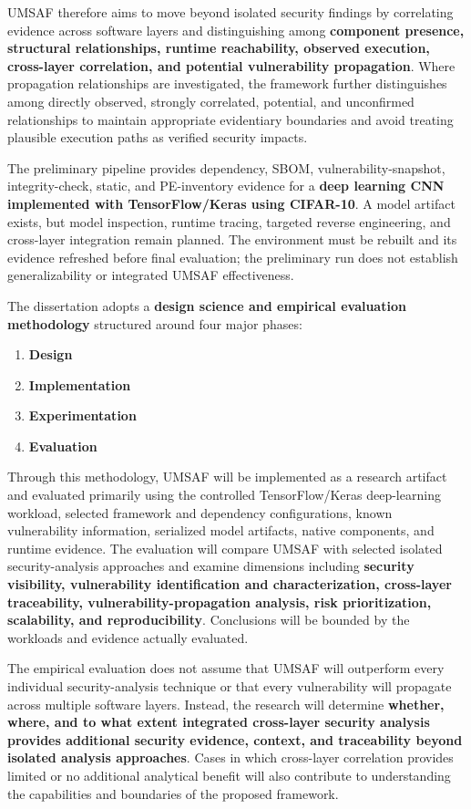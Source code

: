 \documentclass[
  12pt,
  letterpaper,
  oneside]{report}
\begin{document}
UMSAF therefore aims to move beyond isolated security findings by
correlating evidence across software layers and distinguishing among
\textbf{component presence, structural relationships, runtime
reachability, observed execution, cross-layer correlation, and potential
vulnerability propagation}. Where propagation relationships are
investigated, the framework further distinguishes among directly
observed, strongly correlated, potential, and unconfirmed relationships
to maintain appropriate evidentiary boundaries and avoid treating
plausible execution paths as verified security impacts.

The preliminary pipeline provides dependency, SBOM,
vulnerability-snapshot, integrity-check, static, and PE-inventory
evidence for a \textbf{deep learning CNN implemented with
TensorFlow/Keras using CIFAR-10}. A model artifact exists, but model
inspection, runtime tracing, targeted reverse engineering, and
cross-layer integration remain planned. The environment must be rebuilt
and its evidence refreshed before final evaluation; the preliminary run
does not establish generalizability or integrated UMSAF effectiveness.

The dissertation adopts a \textbf{design science and empirical
evaluation methodology} structured around four major phases:

\begin{enumerate}
\item
  \textbf{Design}
\item
  \textbf{Implementation}
\item
  \textbf{Experimentation}
\item
  \textbf{Evaluation}
\end{enumerate}

Through this methodology, UMSAF will be implemented as a research
artifact and evaluated primarily using the controlled TensorFlow/Keras
deep-learning workload, selected framework and dependency
configurations, known vulnerability information, serialized model
artifacts, native components, and runtime evidence. The evaluation will
compare UMSAF with selected isolated security-analysis approaches and
examine dimensions including \textbf{security visibility, vulnerability
identification and characterization, cross-layer traceability,
vulnerability-propagation analysis, risk prioritization, scalability,
and reproducibility}. Conclusions will be bounded by the workloads and
evidence actually evaluated.

The empirical evaluation does not assume that UMSAF will outperform
every individual security-analysis technique or that every vulnerability
will propagate across multiple software layers. Instead, the research
will determine \textbf{whether, where, and to what extent integrated
cross-layer security analysis provides additional security evidence,
context, and traceability beyond isolated analysis approaches}. Cases in
which cross-layer correlation provides limited or no additional
analytical benefit will also contribute to understanding the
capabilities and boundaries of the proposed framework.
\end{document}
